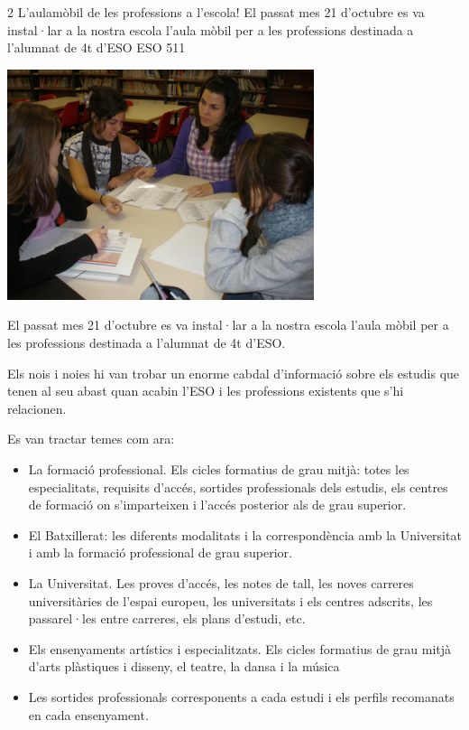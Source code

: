 \begin{news}
{2} %
{L'aulamòbil de les professions a l'escola!}
{El passat mes 21 d’octubre es va instal·lar a la nostra escola l’aula mòbil per a les professions destinada a l’alumnat de 4t d’ESO}
{ESO}
{511} %

\noindent\includegraphics[width=9cm,keepaspectratio]{eso/img/Aulamobil3.JPG}

El passat mes 21 d’octubre es va instal·lar a la nostra escola l’aula mòbil per a les professions destinada a l’alumnat de 4t d’ESO.

Els nois i noies hi van trobar un enorme cabdal d’informació sobre els estudis que tenen al seu abast quan acabin l’ESO i les professions existents que s’hi relacionen.

Es van tractar temes com ara:

\begin{itemize}

	\item La formació professional. Els cicles formatius de grau mitjà: totes les especialitats, requisits d’accés, sortides professionals dels estudis, els centres de formació on s’imparteixen i l’accés posterior als de grau superior.

	\item El Batxillerat: les diferents modalitats i la correspondència amb la Universitat i amb la formació professional de grau superior.

	\item La Universitat. Les proves d’accés, les notes de tall, les noves carreres universitàries de l’espai europeu, les universitats i els centres adscrits, les passarel·les entre carreres, els plans d’estudi, etc.

	\item Els ensenyaments artístics i especialitzats. Els cicles formatius de grau mitjà d’arts plàstiques i disseny, el teatre, la dansa i la música

	\item Les sortides professionals corresponents a cada estudi i els perfils recomanats en cada ensenyament. 

\end{itemize}

\end{news}
